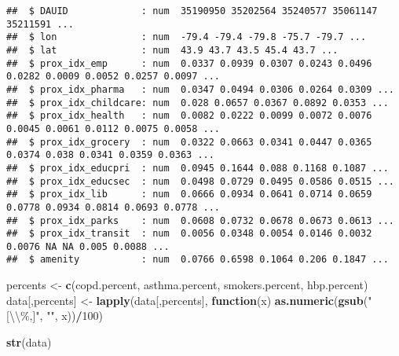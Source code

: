 \documentclass[]{article}
\newenvironment{Shaded}{\begin{snugshade}}{\end{snugshade}}
\newcommand{\CharTok}[1]{\textcolor[rgb]{0.31,0.60,0.02}{#1}}
\newcommand{\ControlFlowTok}[1]{\textcolor[rgb]{0.13,0.29,0.53}{\textbf{#1}}}
\newcommand{\DecValTok}[1]{\textcolor[rgb]{0.00,0.00,0.81}{#1}}
\newcommand{\KeywordTok}[1]{\textcolor[rgb]{0.13,0.29,0.53}{\textbf{#1}}}
\newcommand{\NormalTok}[1]{#1}
\newcommand{\OperatorTok}[1]{\textcolor[rgb]{0.81,0.36,0.00}{\textbf{#1}}}
\newcommand{\StringTok}[1]{\textcolor[rgb]{0.31,0.60,0.02}{#1}}
\begin{document}
\begin{verbatim}
##  $ DAUID             : num  35190950 35202564 35240577 35061147 35211591 ...
##  $ lon               : num  -79.4 -79.4 -79.8 -75.7 -79.7 ...
##  $ lat               : num  43.9 43.7 43.5 45.4 43.7 ...
##  $ prox_idx_emp      : num  0.0337 0.0939 0.0307 0.0243 0.0496 0.0282 0.0009 0.0052 0.0257 0.0097 ...
##  $ prox_idx_pharma   : num  0.0347 0.0494 0.0306 0.0264 0.0309 ...
##  $ prox_idx_childcare: num  0.028 0.0657 0.0367 0.0892 0.0353 ...
##  $ prox_idx_health   : num  0.0082 0.0222 0.0099 0.0072 0.0076 0.0045 0.0061 0.0112 0.0075 0.0058 ...
##  $ prox_idx_grocery  : num  0.0322 0.0663 0.0341 0.0447 0.0365 0.0374 0.038 0.0341 0.0359 0.0363 ...
##  $ prox_idx_educpri  : num  0.0945 0.1644 0.088 0.1168 0.1087 ...
##  $ prox_idx_educsec  : num  0.0498 0.0729 0.0495 0.0586 0.0515 ...
##  $ prox_idx_lib      : num  0.0666 0.0934 0.0641 0.0714 0.0659 0.0778 0.0934 0.0814 0.0693 0.0778 ...
##  $ prox_idx_parks    : num  0.0608 0.0732 0.0678 0.0673 0.0613 ...
##  $ prox_idx_transit  : num  0.0056 0.0348 0.0054 0.0146 0.0032 0.0076 NA NA 0.005 0.0088 ...
##  $ amenity           : num  0.0766 0.6598 0.1064 0.206 0.1847 ...
\end{verbatim}

\begin{Shaded}
\begin{Highlighting}[]
\NormalTok{percents \textless{}{-}}\StringTok{ }\KeywordTok{c}\NormalTok{(}\StringTok{\textquotesingle{}copd.percent\textquotesingle{}}\NormalTok{, }\StringTok{\textquotesingle{}asthma.percent\textquotesingle{}}\NormalTok{, }\StringTok{\textquotesingle{}smokers.percent\textquotesingle{}}\NormalTok{, }\StringTok{\textquotesingle{}hbp.percent\textquotesingle{}}\NormalTok{)}
\NormalTok{data[,percents] \textless{}{-}}\StringTok{ }\KeywordTok{lapply}\NormalTok{(data[,percents], }\ControlFlowTok{function}\NormalTok{(x) }\KeywordTok{as.numeric}\NormalTok{(}\KeywordTok{gsub}\NormalTok{(}\StringTok{"[}\CharTok{\textbackslash{}\textbackslash{}}\StringTok{\%,]"}\NormalTok{, }\StringTok{""}\NormalTok{, x))}\OperatorTok{/}\DecValTok{100}\NormalTok{)}

\KeywordTok{str}\NormalTok{(data)}
\end{Highlighting}
\end{Shaded}
\end{document}
